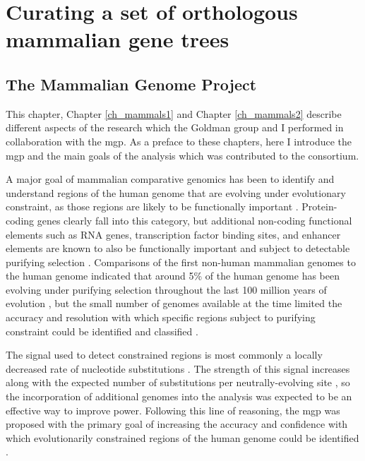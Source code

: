 \chapter{Curating a set of orthologous mammalian gene trees}
\label{ch_orthologs}
\acresetall
\section{The Mammalian Genome Project}

This chapter, Chapter \ref{ch_mammals1} and Chapter \ref{ch_mammals2}
describe different aspects of the research which the Goldman group and
I performed in collaboration with the \ac{mgp}. As a preface to these
chapters, here I introduce the \ac{mgp} and the main goals of the
analysis which was contributed to the consortium.

A major goal of mammalian comparative genomics has been to identify
and understand regions of the human genome that are evolving under
evolutionary constraint, as those regions are likely to be
functionally important \citep{Mouse2002Initial}. Protein-coding genes
clearly fall into this category, but additional non-coding functional
elements such as RNA genes, transcription factor binding sites, and
enhancer elements are known to also be functionally important and
subject to detectable purifying selection
\citep{Birney2007}. Comparisons of the first non-human mammalian
genomes to the human genome indicated that around 5\% of the human
genome has been evolving under purifying selection throughout the last
100 million years of evolution
\citep{Mouse2002Initial,Cooper2004,Rat2004Genome,LindbladToh2005Genome},
but the small number of genomes available at the time limited the
accuracy and resolution with which specific regions subject to
purifying constraint could be identified and classified
\citep{Ponting2011}.

The signal used to detect constrained regions is most commonly a
locally decreased rate of nucleotide substitutions
\citep{Cooper2004}. The strength of this signal increases along with
the expected number of substitutions per neutrally-evolving site
\citep{Siepel2005}, so the incorporation of additional genomes into
the analysis was expected to be an effective way to improve
power. Following this line of reasoning, the \ac{mgp} was proposed
with the primary goal of increasing the accuracy and confidence with
which evolutionarily constrained regions of the human genome could be
identified \citep{Margulies2005Initial,Margulies2007}.

